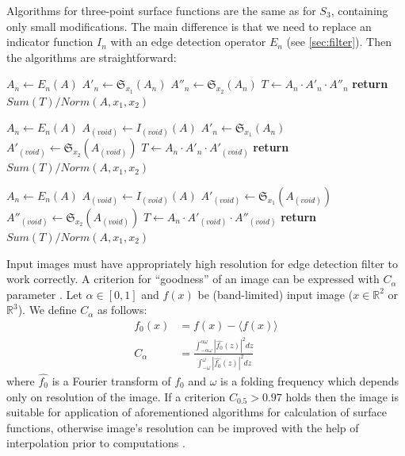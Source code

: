 \documentclass[reprint,amsmath,amssymb,aps,pre,showkeys,showpacs]{revtex4-1}
\begin{document}
Algorithms for three-point surface functions are the same as for $S_3$,
containing only small modifications. The main difference is that we need to
replace an indicator function $I_n$ with an edge detection operator $E_n$
(see \ref{sec:filter}). Then the algorithms are straightforward:
\begin{algorithmic}[1]
  \State $A_n \gets E_n (A)$
  \State $A'_n \gets \mathfrak{S}_{x_1}(A_n)$
  \State $A''_n \gets \mathfrak{S}_{x_2}(A_n)$
  \State $T \gets A_n \cdot A'_n \cdot A''_n$
  \State \textbf{return} $Sum(T) / Norm(A, x_1, x_2)$
  \EndProcedure

  \State $A_n \gets E_n (A)$
  \State $A_{(void)} \gets I_{(void)} (A)$
  \State $A'_n \gets \mathfrak{S}_{x_1}(A_n)$
  \State $A'_{(void)} \gets \mathfrak{S}_{x_2}(A_{(void)})$
  \State $T \gets A_n \cdot A'_n \cdot A'_{(void)}$
  \State \textbf{return} $Sum(T) / Norm(A, x_1, x_2)$
  \EndProcedure

  \State $A_n \gets E_n (A)$
  \State $A_{(void)} \gets I_{(void)} (A)$
  \State $A'_{(void)} \gets \mathfrak{S}_{x_1}(A_{(void)})$
  \State $A''_{(void)} \gets \mathfrak{S}_{x_2}(A_{(void)})$
  \State $T \gets A_n \cdot A'_{(void)} \cdot A''_{(void)}$
  \State \textbf{return} $Sum(T) / Norm(A, x_1, x_2)$
  \EndProcedure
\end{algorithmic}

Input images must have appropriately high resolution for edge detection filter
to work correctly. A criterion for ``goodness'' of an image can be expressed
with $C_{\alpha}$ parameter \cite{samarin2023robust}. Let $\alpha \in [0, 1]$
and $f(x)$ be (band-limited) input image ($x \in \mathbb{R}^2$ or
$\mathbb{R}^3$). We define $C_\alpha$ as follows:
\begin{equation}
  \begin{aligned}
    f_0(x) &= f(x) - \langle f(x) \rangle \\
    C_\alpha &= \frac{\int_{-\alpha\omega}^{\alpha\omega} |\hat{f_0}(z)|^2
      dz}{\int_{-\omega}^{\omega} |\hat{f_0}(z)|^2 dz}
  \end{aligned}
\end{equation}
where $\hat{f_0}$ is a Fourier transform of $f_0$ and $\omega$ is a folding
frequency which depends only on resolution of the image. If a criterion
$C_{0.5} > 0.97$ holds then the image is suitable for application of
aforementioned algorithms for calculation of surface functions, otherwise
image's resolution can be improved with the help of interpolation prior to
computations \cite{samarin2023robust}.
\end{document}
